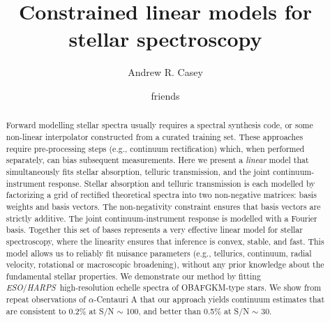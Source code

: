 \documentclass[modern]{aastex631}
\newcommand{\chosentitle}{Constrained linear models for stellar spectroscopy}
\newcommand{\project}[1]{\textit{#1}}
\newcommand{\eso}{\project{ESO}}
\newcommand{\harps}{\project{HARPS}}
\begin{document}
\title{\chosentitle}

\author[0000-0003-0174-0564]{Andrew R. Casey}

\author{friends}



\begin{abstract}\noindent
Forward modelling stellar spectra usually requires a spectral synthesis code, or some non-linear interpolator constructed from a curated training set.
These approaches require pre-processing steps (e.g., continuum rectification) which, when performed separately, can bias subsequent measurements.
Here we present a \emph{linear} model that simultaneously fits stellar absorption, telluric transmission, and the joint continuum-instrument response.
Stellar absorption and telluric transmission is each modelled by factorizing a grid of rectified theoretical spectra into two non-negative matrices: basis weights and basis vectors.
The non-negativity constraint ensures that basis vectors are strictly additive.
The joint continuum-instrument response is modelled with a Fourier basis. 
Together this set of bases represents a very effective linear model for stellar spectroscopy, where the linearity ensures that inference is convex, stable, and fast.
This model allows us to reliably fit nuisance parameters (e.g., tellurics, continuum, radial velocity, rotational or macroscopic broadening), without any prior knowledge about the fundamental stellar properties.
We demonstrate our method by fitting \eso/\harps\ high-resolution echelle spectra of OBAFGKM-type stars.
We show from repeat observations of $\alpha$-Centauri A that our approach yields continuum estimates that are consistent to 0.2\% at S/N $\sim$ 100, and better than 0.5\% at S/N $\sim$ 30.
\end{abstract}
\end{document}
